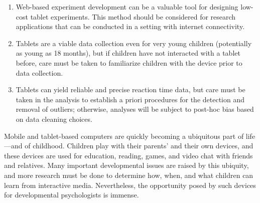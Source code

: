 \documentclass[man,noapacite]{apa2}
\begin{document}
\begin{enumerate}
\item Web-based experiment development can be a valuable tool for designing low-cost tablet experiments. This method should be considered for research applications that can be conducted in a setting with internet connectivity.
\item Tablets are a viable data collection even for very young children (potentially as young as 18 months), but if children have not interacted with a tablet before, care must be taken to familiarize children with the device prior to data collection.
\item Tablets can yield reliable and precise reaction time data, but care must be taken in the analysis to establish a priori procedures for the detection and removal of outliers; otherwise, analyses will be subject to post-hoc bias based on data cleaning choices. 
\end{enumerate}

Mobile and tablet-based computers are quickly becoming a ubiquitous part of life---and of childhood. Children play with their parents' and their own devices, and these devices are used for education, reading, games, and video chat with friends and relatives. Many important developmental issues are raised by this ubiquity, and more research must be done to determine how, when, and what children can learn from interactive media. Nevertheless, the opportunity posed by such devices for developmental psychologists is immense.

\newpage



\end{document}
